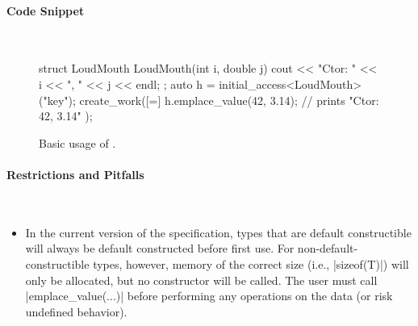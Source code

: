 \paragraph{Code Snippet}\mbox{}\\ 
\begin{figure}[!h]
\begin{CppCodeNumb}
struct LoudMouth {
  LoudMouth(int i, double j) { cout << "Ctor: " << i << ", " << j << endl; }
};
auto h = initial_access<LoudMouth>("key");
create_work([=]{
  h.emplace_value(42, 3.14); // prints "Ctor: 42, 3.14" 
});
\end{CppCodeNumb}
\label{fig:fe_api_initialaccess}
\caption{Basic usage of \protect{}.}
\end{figure}

\paragraph{Restrictions and Pitfalls}\mbox{}\\ 
\begin{itemize}
  \item In the current version of the specification, types that are default constructible
  will always be default constructed before first use.  For
  non-default-constructible types, however, memory of the correct size (i.e.,
  |sizeof(T)|) will only be allocated, but no constructor will be called.  The 
  user must call |emplace_value(...)| before performing any operations on the data (or risk undefined behavior).
\end{itemize}




